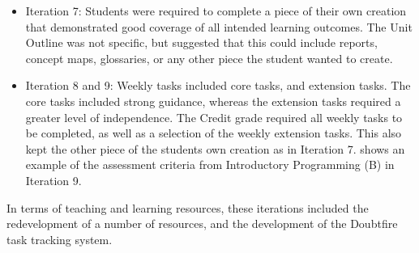 \begin{itemize}[noitemsep,nolistsep]
  \item Iteration 7: Students were required to complete a piece of their own creation that demonstrated good coverage of all intended learning outcomes. The Unit Outline was not specific, but suggested that this could include reports, concept maps, glossaries, or any other piece the student wanted to create.
  \item Iteration 8 and 9: Weekly tasks included core tasks, and extension tasks. The core tasks included strong guidance, whereas the extension tasks required a greater level of independence. The Credit grade required all weekly tasks to be completed, as well as a selection of the weekly extension tasks. This also kept the other piece of the students own creation as in Iteration 7.  shows an example of the assessment criteria from Introductory Programming (B) in Iteration 9.
\end{itemize}

In terms of teaching and learning resources, these iterations included the redevelopment of a number of resources, and the development of the Doubtfire task tracking system.

